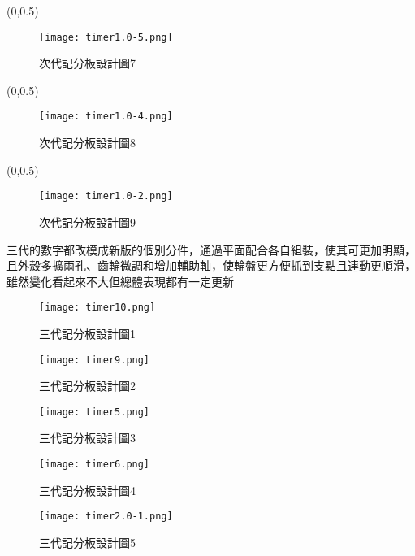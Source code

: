 {\begin{textblock}{6}(0,0.5)
\begin{figure}
  \centering
  \texttt{[image: timer1.0-5.png]}
  \caption{次代記分板設計圖7}
  \label{fig:example}
\end{figure}
\end{textblock}}

{\begin{textblock}{6}(0,0.5)
\begin{figure}
  \centering
  \texttt{[image: timer1.0-4.png]}
  \caption{次代記分板設計圖8}
  \label{fig:example}
\end{figure}
\end{textblock}}

{\begin{textblock}{6}(0,0.5)
\begin{figure}
  \centering
  \texttt{[image: timer1.0-2.png]}
  \caption{次代記分板設計圖9}
  \label{fig:example}
\end{figure}
\end{textblock}}


三代的數字都改模成新版的個別分件，通過平面配合各自組裝，使其可更加明顯，且外殼多擴兩孔、齒輪微調和增加輔助軸，使輪盤更方便抓到支點且連動更順滑，雖然變化看起來不大但總體表現都有一定更新


\begin{figure}
  \centering
  \texttt{[image: timer10.png]}
  \caption{三代記分板設計圖1}
  \label{fig:example}
\end{figure}


\begin{figure}
  \centering
  \texttt{[image: timer9.png]}
  \caption{三代記分板設計圖2}
  \label{fig:example}
\end{figure}


\begin{figure}
  \centering
  \texttt{[image: timer5.png]}
  \caption{三代記分板設計圖3}
  \label{fig:example}
\end{figure}


\begin{figure}
  \centering
  \texttt{[image: timer6.png]}
  \caption{三代記分板設計圖4}
  \label{fig:example}
\end{figure}


\begin{figure}
  \centering
  \texttt{[image: timer2.0-1.png]}
  \caption{三代記分板設計圖5}
  \label{fig:example}
\end{figure}


